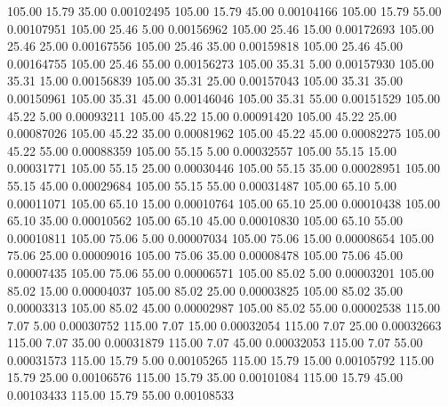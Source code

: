     105.00     15.79     35.00     0.00102495
    105.00     15.79     45.00     0.00104166
    105.00     15.79     55.00     0.00107951
    105.00     25.46      5.00     0.00156962
    105.00     25.46     15.00     0.00172693
    105.00     25.46     25.00     0.00167556
    105.00     25.46     35.00     0.00159818
    105.00     25.46     45.00     0.00164755
    105.00     25.46     55.00     0.00156273
    105.00     35.31      5.00     0.00157930
    105.00     35.31     15.00     0.00156839
    105.00     35.31     25.00     0.00157043
    105.00     35.31     35.00     0.00150961
    105.00     35.31     45.00     0.00146046
    105.00     35.31     55.00     0.00151529
    105.00     45.22      5.00     0.00093211
    105.00     45.22     15.00     0.00091420
    105.00     45.22     25.00     0.00087026
    105.00     45.22     35.00     0.00081962
    105.00     45.22     45.00     0.00082275
    105.00     45.22     55.00     0.00088359
    105.00     55.15      5.00     0.00032557
    105.00     55.15     15.00     0.00031771
    105.00     55.15     25.00     0.00030446
    105.00     55.15     35.00     0.00028951
    105.00     55.15     45.00     0.00029684
    105.00     55.15     55.00     0.00031487
    105.00     65.10      5.00     0.00011071
    105.00     65.10     15.00     0.00010764
    105.00     65.10     25.00     0.00010438
    105.00     65.10     35.00     0.00010562
    105.00     65.10     45.00     0.00010830
    105.00     65.10     55.00     0.00010811
    105.00     75.06      5.00     0.00007034
    105.00     75.06     15.00     0.00008654
    105.00     75.06     25.00     0.00009016
    105.00     75.06     35.00     0.00008478
    105.00     75.06     45.00     0.00007435
    105.00     75.06     55.00     0.00006571
    105.00     85.02      5.00     0.00003201
    105.00     85.02     15.00     0.00004037
    105.00     85.02     25.00     0.00003825
    105.00     85.02     35.00     0.00003313
    105.00     85.02     45.00     0.00002987
    105.00     85.02     55.00     0.00002538
    115.00      7.07      5.00     0.00030752
    115.00      7.07     15.00     0.00032054
    115.00      7.07     25.00     0.00032663
    115.00      7.07     35.00     0.00031879
    115.00      7.07     45.00     0.00032053
    115.00      7.07     55.00     0.00031573
    115.00     15.79      5.00     0.00105265
    115.00     15.79     15.00     0.00105792
    115.00     15.79     25.00     0.00106576
    115.00     15.79     35.00     0.00101084
    115.00     15.79     45.00     0.00103433
    115.00     15.79     55.00     0.00108533
